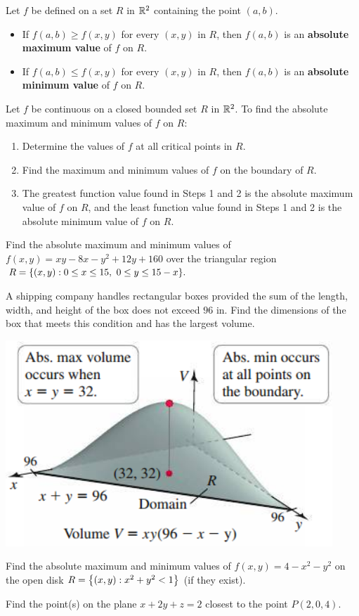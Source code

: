 \documentclass[mathNotesPreamble]{subfiles}
\begin{document}
  \begin{defn*}
    Let $f$ be defined on a set $R$ in $\mathbb{R}^2$ containing the point $(a,b)$. 
    \begin{itemize}
      \item 
        If $f(a,b)\geq f(x,y)$ for every $(x,y)$ in $R$, then $f(a,b)$ is an \textbf{absolute maximum value} of $f$ on $R$.
      \item 
        If $f(a,b)\leq f(x,y)$ for every $(x,y)$ in $R$, then $f(a,b)$ is an \textbf{absolute minimum value} of $f$ on $R$.
    \end{itemize}
  \end{defn*}
  \begin{thmBox*}
    Let $f$ be continuous on a closed bounded set $R$ in $\mathbb{R}^2$. To find the absolute maximum and minimum values of $f$ on $R$:
    \begin{enumerate}
      \item 
        Determine the values of $f$ at all critical points in $R$.
      \item 
        Find the maximum and minimum values of $f$ on the boundary of $R$.
      \item 
        The greatest function value found in Steps 1 and 2 is the absolute maximum value of $f$ on $R$, and the least function value found in Steps 1 and 2 is the absolute minimum value of $f$ on $R$.
    \end{enumerate}
  \end{thmBox*}
  \pagebreak

  \begin{ex*}
    Find the absolute maximum and minimum values of $f(x,y)=xy-8x-y^2+12y+160$ over the triangular region $R={\left\{(x,y): 0\leq x\leq 15,\ 0\leq y\leq 15-x\right\}}.$
  \end{ex*}
  \pagebreak

  \begin{ex*}
    A shipping company handles rectangular boxes provided the sum of the length, width, and height of the box does not exceed $96$ in. Find the dimensions of the box that meets this condition and has the largest volume.
  \end{ex*}
  \begin{flushright}
    \includegraphics[width=0.4\linewidth]{images/briggs_15_07/fig15_73}
  \end{flushright}
  \pagebreak

  \begin{ex*}
    Find the absolute maximum and minimum values of $f(x,y)=4-x^2-y^2$ on the open disk $R={\left\{(x,y): x^2+y^2<1\right\}}$ (if they exist).
  \end{ex*}
  \pagebreak

  \begin{ex*}
    Find the point(s) on the plane $x+2y+z=2$ closest to the point $P(2,0,4)$.
  \end{ex*}
  \pagebreak
  
\end{document}
